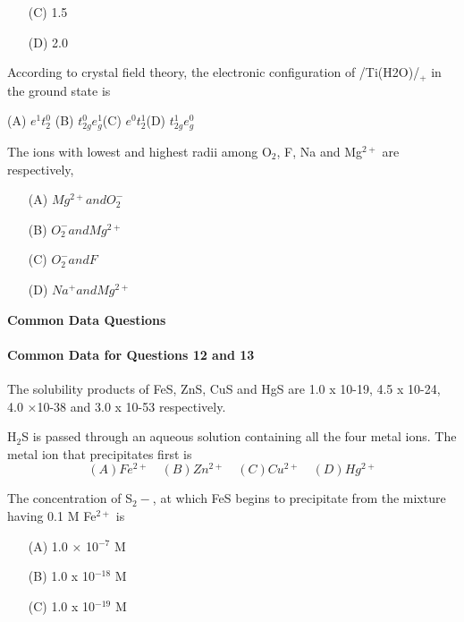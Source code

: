 \documentclass[journal]{IEEEtran}
\begin{document}
\begin{enumerate}
{\begin{itemize}
\item[(C)] 1.5

\item[(D)] 2.0
	\end{itemize}


\item {According to crystal field theory, the electronic configuration of /Ti(H2O)/$_+$ in the ground state is}


(A) $e^1t^0_2$ \hspace{10mm} (B) $t^0_{2g}e_g^1$\hspace{10mm}(C) $e^0t^1_2$\hspace{10mm}(D) $t^1_{2g}e^0_g $

\item {The ions with lowest and highest radii among O$_2$, F, Na and Mg$^{2+}$ are respectively,}


		\begin{itemize}
			\item[(A)] $Mg^{2+} and O_2^-$
			\item[(B)] $O_2^- and Mg^{2+}$
			\item[(C)] $O_2^- and F$
			\item[(D)] $Na^+ and Mg^{2+}$

		\end{itemize}
\textbf{Common Data Questions}
\newline
\paragraph{Common Data for Questions 12 and 13}

The solubility products of FeS, ZnS, CuS and HgS are 1.0 x 10-19, 4.5 x 10-24, 4.0 ×10-38 and 3.0 x 10-53 respectively.

\item {H$_2$S is passed through an aqueous solution containing all the four metal ions. The metal ion that precipitates first is}
	\[(A) Fe^{2+} \quad (B) Zn^{2+} \quad(C) Cu^{2+} \quad(D) Hg^{2+}\]}
\item {The concentration of S$_2-$, at which FeS begins to precipitate from the mixture having 0.1 M Fe$^{2+}$ is}
	\begin{itemize}
\item[(A)] 1.0 × 10$^{-7}$ M

\item[(B)] 1.0 x 10$^{-18}$ M

\item[(C)] 1.0 x 10$^{-19}$ M


\end{itemize}
\end{enumerate}
\end{document}
